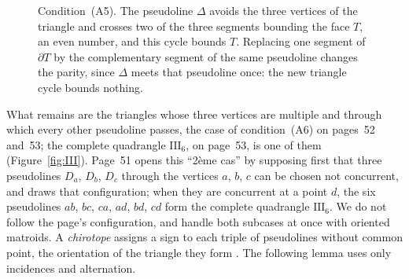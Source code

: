 \documentclass[11pt,a4paper]{amsart}
\theoremstyle{definition}
\theoremstyle{remark}
\newcommand{\III}{\mathrm{III}_{6}}
\begin{document}
\begin{figure}[ht]
\centering
{}
\caption{Condition~(A5). The pseudoline $\Delta$ avoids the three vertices of the triangle and crosses two of the three segments bounding the face $T$, an even number, and this cycle bounds $T$. Replacing one segment of $\partial T$ by the complementary segment of the same pseudoline changes the parity, since $\Delta$ meets that pseudoline once: the new triangle cycle bounds nothing.}\label{fig:A5}
\end{figure}

What remains are the triangles whose three vertices are multiple and through which every other pseudoline passes, the case of condition~(A6) on pages~52 and~53; the complete quadrangle $\III$, on page~53, is one of them (Figure~\ref{fig:III}). Page~51 opens this ``2\`eme cas'' by supposing first that three pseudolines $D_a$, $D_b$, $D_c$ through the vertices $a$, $b$, $c$ can be chosen not concurrent, and draws that configuration; when they are concurrent at a point $d$, the six pseudolines $ab$, $bc$, $ca$, $ad$, $bd$, $cd$ form the complete quadrangle $\III$. We do not follow the page's configuration, and handle both subcases at once with oriented matroids. A \emph{chirotope} assigns a sign to each triple of pseudolines without common point, the orientation of the triangle they form \cite{bjorner1999}. The following lemma uses only incidences and alternation.
\end{document}
